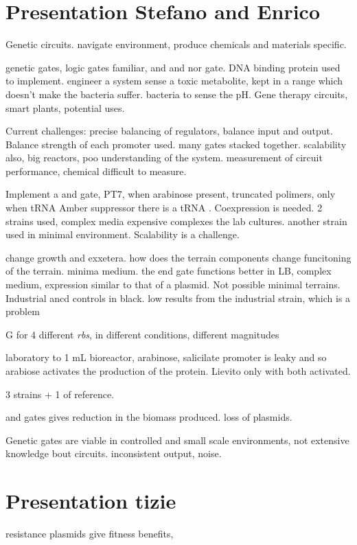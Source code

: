 \section{Presentation Stefano and Enrico}

Genetic circuits. navigate environment, produce chemicals and materials specific. 

genetic gates, logic gates familiar, and and nor gate. DNA binding protein used to implement. engineer a system sense a toxic metabolite, kept in a range which doesn't make the bacteria suffer.
bacteria to sense the pH.
Gene therapy circuits, smart plants, potential uses.

Current challenges: precise balancing of regulators, balance input and output. Balance strength of each promoter used. many gates stacked together. scalability also, big reactors, poo understanding of the system. measurement of circuit performance, chemical difficult to measure. 

Implement a and gate, PT7, when arabinose present, truncated polimers, only when tRNA Amber suppressor there is a tRNA . Coexpression is needed. 
2 strains used, complex media expensive complexes the lab cultures. another strain used in minimal environment. Scalability is a challenge. 

change growth and exxetera. how does the terrain components change funcitoning of the terrain. minima medium. the end gate functions better in LB, complex medium, expression similar to that of a plasmid. Not possible minimal terrains.
Industrial ancd controls in black. low results from the industrial strain, which is a problem

\delta G for 4 different \textit{rbs}, in different conditions, different magnitudes

laboratory to 1 mL bioreactor, 
arabinose, salicilate promoter is leaky and so arabiose activates the production of the protein.
Lievito only with both activated. 

3 strains + 1 of reference. 

and gates gives reduction in the biomass produced. 
loss of plasmids.

Genetic gates are viable in controlled and small scale environments, not extensive knowledge bout circuits. inconsistent output, noise. 

\section{Presentation tizie}
resistance plasmids give fitness benefits, 